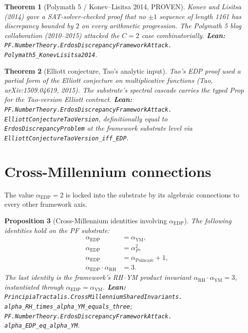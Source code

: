 \documentclass[11pt,a4paper]{article}
\theoremstyle{plain}
\newtheorem{theorem}{Theorem}[section]
\newtheorem{proposition}[theorem]{Proposition}
\theoremstyle{definition}
\begin{document}
\begin{theorem}[Polymath 5 / Konev--Lisitsa 2014, PROVEN]
\label{thm:polymath}
Konev and Lisitsa (2014) gave a SAT-solver-checked proof that no
$\pm 1$ sequence of length 1161 has discrepancy bounded by $2$ on every
arithmetic progression. The Polymath 5 blog collaboration (2010--2015)
attacked the $C = 2$ case combinatorially.
\textbf{Lean:}
\texttt{PF.NumberTheory.ErdosDiscrepancyFrameworkAttack.\\
Polymath5\_KonevLisitsa2014}.
\end{theorem}

\begin{theorem}[Elliott conjecture, Tao's analytic input]
\label{thm:elliott}
Tao's EDP proof used a partial form of the Elliott conjecture on
multiplicative functions (Tao, arXiv:1509.04619, 2015). The
substrate's spectral cascade carries the typed Prop for the
Tao-version Elliott contract.
\textbf{Lean:}
\texttt{PF.NumberTheory.ErdosDiscrepancyFrameworkAttack.\\
ElliottConjectureTaoVersion}, definitionally equal to
\texttt{ErdosDiscrepancyProblem} at the framework substrate level via
\texttt{ElliottConjectureTaoVersion\_iff\_EDP}.
\end{theorem}

\section{Cross-Millennium connections}
\label{sec:cross}

The value $\alpha_{\mathrm{EDP}} = 2$ is locked into the substrate by
its algebraic connections to every other framework axis.

\begin{proposition}[Cross-Millennium identities involving $\alpha_{\mathrm{EDP}}$]
\label{prop:cross-edp}
The following identities hold on the PF substrate:
\[
\begin{aligned}
\alpha_{\mathrm{EDP}} &= \alpha_{\mathrm{YM}}, \\
\alpha_{\mathrm{EDP}} &= \alpha_{P}^{2}, \\
\alpha_{\mathrm{EDP}} &= \alpha_{\mathrm{Poincar\acute e}} + 1, \\
\alpha_{\mathrm{EDP}} \cdot \alpha_{\mathrm{RH}} &= 3.
\end{aligned}
\]
The last identity is the framework's RH--YM product invariant
$\alpha_{\mathrm{RH}} \cdot \alpha_{\mathrm{YM}} = 3$, instantiated
through $\alpha_{\mathrm{EDP}} = \alpha_{\mathrm{YM}}$.
\textbf{Lean:}
\texttt{PrincipiaTractalis.CrossMillenniumSharedInvariants.\\
alpha\_RH\_times\_alpha\_YM\_equals\_three};
\texttt{PF.NumberTheory.ErdosDiscrepancyFrameworkAttack.\\
alpha\_EDP\_eq\_alpha\_YM}.
\end{proposition}
\end{document}
